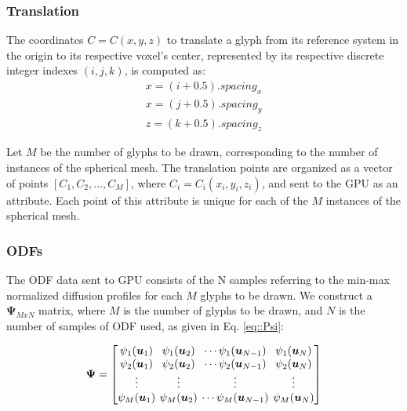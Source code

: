 \documentclass[twoside,twocolumn,10pt]{article}
\begin{document}
\subsubsection{Translation}

The coordinates $C= C(x, y, z)$ to translate a glyph from its reference system in the origin to its respective voxel's center, represented by its respective discrete integer indexes $(i, j, k)$, is computed as:
\begin{align}
 \label{eq::translation}
    x = (i + 0.5).spacing_x \nonumber\\
    x = (j + 0.5).spacing_y \\
    z = (k + 0.5).spacing_z \nonumber
\end{align}


Let $M$ be the number of glyphs to be drawn, corresponding to the number of instances of the spherical mesh. The translation points are organized as a vector of points $[C_1,C_2, \dots, C_M]$, where $C_i= C_i(x_i, y_i, z_i)$, and sent to the GPU as an attribute. Each point of this attribute is unique for each of the $M$ instances of the spherical mesh.






\subsubsection{ODFs}

The ODF data sent to GPU consists of the N samples referring to the min-max normalized diffusion profiles for each $M$ glyphs to be drawn. We construct a $\bm{\Psi}_{MxN}$ matrix, where $M$ is the number of glyphs to be drawn, and $N$ is the number of samples of ODF used, as given in Eq. \ref{eq::Psi}:

\begin{equation}
\label{eq::Psi}
\bm{\Psi} = 
\begingroup %
\setlength\arraycolsep{2pt}
\begin{bmatrix} 
    \psi_1(\bm{u}_1) & \psi_1(\bm{u}_2) & \cdots \psi_1(\bm{u}_{N-1}) & \psi_1(\bm{u}_{N})  \\    
     \psi_2(\bm{u}_1)& \psi_2(\bm{u}_2) & \cdots \psi_2(\bm{u}_{N-1}) & \psi_2(\bm{u}_{N}) \\
    \vdots & \vdots & \vdots & \vdots  \\    
     \psi_M(\bm{u}_1)&\psi_M(\bm{u}_2) & \cdots \psi_M(\bm{u}_{N-1}) & \psi_M(\bm{u}_{N})
\end{bmatrix}
\endgroup
\end{equation}
\end{document}

